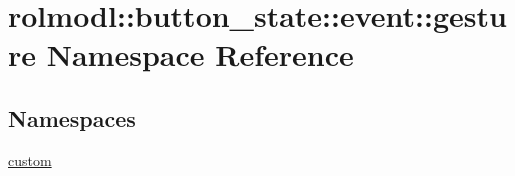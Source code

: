 \hypertarget{namespacerolmodl_1_1button__state_1_1event_1_1gesture}{}\section{rolmodl\+::button\+\_\+state\+::event\+::gesture Namespace Reference}
\label{namespacerolmodl_1_1button__state_1_1event_1_1gesture}
\subsection*{Namespaces}
\begin{DoxyCompactItemize}
\item 
 \mbox{\hyperlink{namespacerolmodl_1_1button__state_1_1event_1_1gesture_1_1custom}{custom}}
\end{DoxyCompactItemize}
